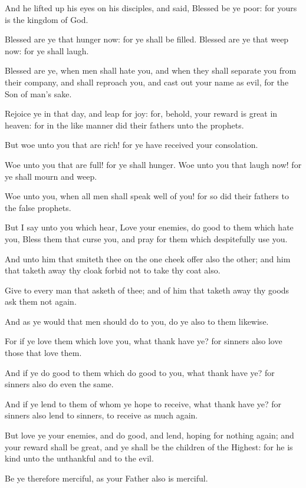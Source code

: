 \verse And he lifted up his eyes on his disciples, and said, Blessed be ye poor: for yours is the kingdom of God.

\verse Blessed are ye that hunger now: for ye shall be filled. Blessed are ye that weep now: for ye shall laugh.

\verse Blessed are ye, when men shall hate you, and when they shall separate you from their company, and shall reproach you, and cast out your name as evil, for the Son of man's sake.

\verse Rejoice ye in that day, and leap for joy: for, behold, your reward is great in heaven: for in the like manner did their fathers unto the prophets.

\verse But woe unto you that are rich! for ye have received your consolation.

\verse Woe unto you that are full! for ye shall hunger. Woe unto you that laugh now! for ye shall mourn and weep.

\verse Woe unto you, when all men shall speak well of you! for so did their fathers to the false prophets.

\verse But I say unto you which hear, Love your enemies, do good to them which hate you, \verse Bless them that curse you, and pray for them which despitefully use you.

\verse And unto him that smiteth thee on the one cheek offer also the other; and him that taketh away thy cloak forbid not to take thy coat also.

\verse Give to every man that asketh of thee; and of him that taketh away thy goods ask them not again.

\verse And as ye would that men should do to you, do ye also to them likewise.

\verse For if ye love them which love you, what thank have ye? for sinners also love those that love them.

\verse And if ye do good to them which do good to you, what thank have ye?  for sinners also do even the same.

\verse And if ye lend to them of whom ye hope to receive, what thank have ye? for sinners also lend to sinners, to receive as much again.

\verse But love ye your enemies, and do good, and lend, hoping for nothing again; and your reward shall be great, and ye shall be the children of the Highest: for he is kind unto the unthankful and to the evil.

\verse Be ye therefore merciful, as your Father also is merciful.

